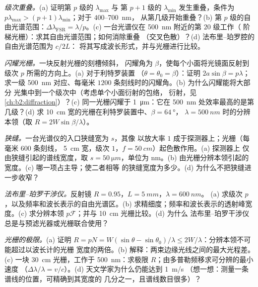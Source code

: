 \begin{exercise}[$\star\star$]\label{exo:b2:gratings:6}
\emph{级次重叠。}(a) 证明第 $p$ 级的 $\lambda_{\max}$ 与
第 $p + 1$ 级的 $\lambda_{\min}$ 发生重叠，条件为 $p\lambda_{\max} > (p + 1)\lambda_{\min}$；对于 $400$--\qty{700}{nm}，
从第几级开始重叠？(b) 第 $p$ 级的自由光谱范围：$\Delta\lambda_{\text{FSR}}
= \lambda/p$。(c) 一台光谱仪在 \qty{500}{nm} 附近的第 $20$ 级工作（
阶梯光栅）：求其自由光谱范围；如何消除重叠
（交叉色散）？(d) 法布里–珀罗腔的自由光谱范围为 $c/2L$：
将其写成波长形式，并与光栅进行比较。
\end{exercise}

\begin{exercise}[$\star\star$]\label{exo:b2:gratings:7}
\emph{闪耀光栅。}一块反射光栅的刻槽倾斜，
闪耀角为 $\beta$，使每个小面将光镜面反射到
级次 $p$ 所需的方向上。(a) 对于利特罗装置
（$\theta = \theta_0 = \beta$）：证明 $2a\sin\beta = p\lambda$；求一级
\qty{500}{nm} 对应、每毫米 $1200$ 条刻线时的闪耀角。(b) 为什么闪耀能将大部分
光集中到一个级次中（考虑单个小面衍射的包络，
衍射，见\cref{ch:b2:diffraction}）？(c) 同一光栅闪耀于
\qty{1}{\micro m}：它在 \qty{500}{nm} 处效率最高的是第几级？(d)
求 \qty{10}{cm} 宽的光栅在利特罗装置中、$\beta = \qty{64}{\degree}$，
$\lambda = \qty{500}{nm}$ 时的分辨本领（取 $R = 2W\sin\beta/\lambda$）。
\end{exercise}

\begin{exercise}[$\star\star$]\label{exo:b2:gratings:8}
\emph{狭缝。}一台光谱仪的入口狭缝宽为 $s$，其像
以放大率 $1$ 成于探测器上；光栅（每毫米 $600$ 条刻线，
\qty{5}{cm} 宽，级次 $1$，$f = \qty{50}{cm}$）起色散作用。(a) 探测器上
仅由狭缝引起的谱线宽度，取 $s = \qty{50}{\micro m}$，单位为 nm。(b)
由光栅分辨本领引起的宽度。(c) 哪一项占主导；使二者相等
的狭缝宽度为多少。(d) 为什么不把狭缝进一步收窄？
\end{exercise}

\begin{exercise}[$\star\star$]\label{exo:b2:gratings:9}
\emph{法布里–珀罗干涉仪。}反射镜 $R = 0.95$，$L = \qty{5}{mm}$，$\lambda = \qty{600}{nm}$。
(a) 求级次 $p$，以及频率和波长表示的自由光谱区。(b)
求精细度；频率和波长表示的透射峰宽度。(c)
求分辨本领 $p\mathcal F$；并与 \qty{10}{cm} 光栅比较。(d) 为什么
法布里–珀罗干涉仪总是与预滤光器或光栅联合使用？
\end{exercise}

\begin{exercise}[$\star\star\star$]\label{exo:b2:gratings:10}
\emph{光栅的极限。}(a) 证明 $R = pN = W(\sin\theta - \sin\theta_0)
/\lambda \le 2W/\lambda$：分辨本领不可能超过以波长计的光栅
宽度的两倍。(b) 解释：两束边缘光线之间的最大光程差。(c) 一块
\qty{30}{cm} 光栅，工作于
\qty{500}{nm}：求极限 $R$；由多普勒频移求可分辨的最小速度
（$\Delta\lambda/\lambda = v/c$）。(d) 天文学家为什么仍能达到 \qty{1}{m/s}
（想一想：测量一条谱线的位置，可精确到其宽度的
几分之一，且谱线数目很多）？
\end{exercise}

